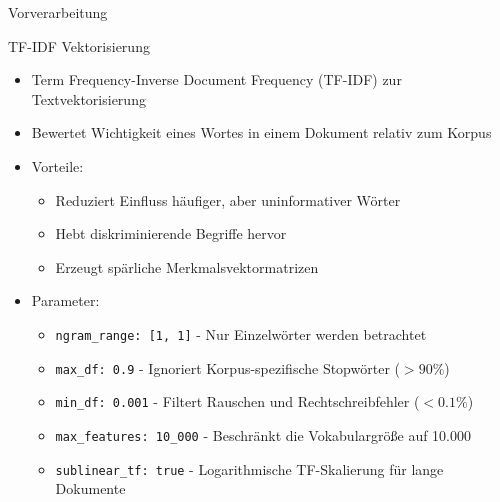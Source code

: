 \documentclass[aspectratio=169]{beamer} %
\begin{document}
\begin{frame}{Vorverarbeitung}
    \begin{block}{TF-IDF Vektorisierung}
        \begin{itemize}
            \item Term Frequency-Inverse Document Frequency (TF-IDF) zur Textvektorisierung
            \item Bewertet Wichtigkeit eines Wortes in einem Dokument relativ zum Korpus
            \item Vorteile:
                  \begin{itemize}
                      \item Reduziert Einfluss häufiger, aber uninformativer Wörter
                      \item Hebt diskriminierende Begriffe hervor
                      \item Erzeugt spärliche Merkmalsvektormatrizen
                  \end{itemize}
            \item Parameter:
                  \begin{itemize}
                      \item \texttt{ngram\_range: [1, 1]} - Nur Einzelwörter werden betrachtet
                      \item \texttt{max\_df: 0.9} - Ignoriert Korpus-spezifische Stopwörter ($>90\%$)
                      \item \texttt{min\_df: 0.001} - Filtert Rauschen und Rechtschreibfehler ($<0.1\%$)
                      \item \texttt{max\_features: 10\_000} - Beschränkt die Vokabulargröße auf 10.000
                      \item \texttt{sublinear\_tf: true} - Logarithmische TF-Skalierung für lange Dokumente
                  \end{itemize}
        \end{itemize}
    \end{block}
\end{frame}
\end{document}

